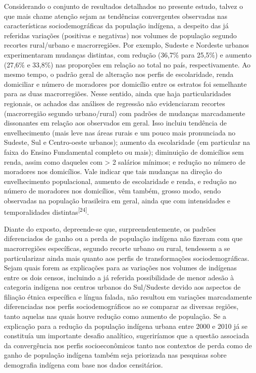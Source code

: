 \documentclass{article}
\begin{document}
Considerando o conjunto de resultados detalhados no presente estudo, talvez o
que mais chame atenção sejam as tendências convergentes observadas nas
características sociodemográficas da população indígena, a despeito das já
referidas variações (positivas e negativas) nos volumes de população segundo
recortes rural/urbano e macrorregiões. Por exemplo, Sudeste e Nordeste urbanos
experimentaram mudanças distintas, com redução (36,7\% para 25,5\%) e aumento
(27,6\% e 33,8\%) nas proporções em relação ao total no país, respectivamente.
Ao mesmo tempo, o padrão geral de alteração nos perfis de escolaridade, renda
domiciliar e número de moradores por domicílio entre os estratos foi semelhante
para as duas macrorregiões. Nesse sentido, ainda que haja particularidades
regionais, os achados das análises de regressão não evidenciaram recortes
(macrorregião segundo urbano/rural) com padrões de mudanças marcadamente
dissonantes em relação aos observados em geral. Isso incluiu tendência de
envelhecimento (mais leve nas áreas rurais e um pouco mais pronunciada no
Sudeste, Sul e Centro-oeste urbanos); aumento da escolaridade (em particular na
faixa do Ensino Fundamental completo ou mais); diminuição de domicílios sem
renda, assim como daqueles com > 2 salários mínimos; e redução no número de
moradores nos domicílios. Vale indicar que tais mudanças na direção do
envelhecimento populacional, aumento de escolaridade e renda, e redução no
número de moradores nos domicílios, vêm também, grosso modo, sendo observadas na
população brasileira em geral, ainda que com intensidades e temporalidades
distintas\textsuperscript{[}\textsuperscript{24}\textsuperscript{]}.

Diante do exposto, depreende-se que, surpreendentemente, os padrões
diferenciados de ganho ou a perda de população indígena não fizeram com que
macrorregiões específicas, segundo recorte urbano ou rural, tendessem a se
particularizar ainda mais quanto aos perfis de transformações sociodemográficas.
Sejam quais forem as explicações para as variações nos volumes de indígenas
entre os dois censos, incluindo a já referida possibilidade de menor adesão à
categoria indígena nos centros urbanos do Sul/Sudeste devido aos aspectos de
filiação étnica específica e língua falada, não resultou em variações
marcadamente diferenciadas nos perfis sociodemográficos ao se comparar as
diversas regiões, tanto aquelas nas quais houve redução como aumento de
população. Se a explicação para a redução da população indígena urbana entre
2000 e 2010 já se constituía um importante desafio analítico, sugeriríamos que a
questão associada da convergência nos perfis socioeconômicos tanto nos contextos
de perda como de ganho de população indígena também seja priorizada nas
pesquisas sobre demografia indígena com base nos dados censitários.
\end{document}
